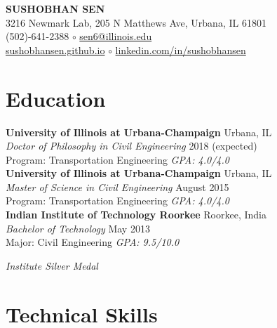 \documentclass[12pt]{article}
\begin{document}
\begin{center}
{\huge \uppercase{\textbf{Sushobhan Sen}}} \\
3216 Newmark Lab, 205 N Matthews Ave, Urbana, IL 61801 \\
(502)-641-2388 $\circ$ \href{mailto:sen6@illinois.edu}{sen6@illinois.edu} \\
\href{http://sushobhansen.github.io/}{sushobhansen.github.io} $\circ$ \href{http://linkedin.com/in/sushobhansen}{linkedin.com/in/sushobhansen}
\end{center} 

\hfill \break
\section*{Education}
\textbf{University of Illinois at Urbana-Champaign} \hfill Urbana, IL\\
\textit{Doctor of Philosophy in Civil Engineering} \hfill 2018 (expected)\\
Program: Transportation Engineering \hfill \textit{GPA: 4.0/4.0} \\

\textbf{University of Illinois at Urbana-Champaign} \hfill Urbana, IL\\
\textit{Master of Science in Civil Engineering} \hfill August 2015\\
Program: Transportation Engineering \hfill \textit{GPA: 4.0/4.0} \\

\textbf{Indian Institute of Technology Roorkee} \hfill Roorkee, India\\
\textit{Bachelor of Technology} \hfill May 2013\\
Major: Civil Engineering \hfill \textit{GPA: 9.5/10.0} \\
\strut \hfill \textit{Institute Silver Medal} \\

\section*{Technical Skills}
\end{document}
